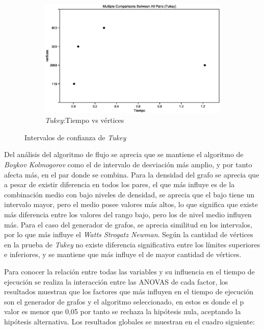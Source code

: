 \documentclass{article}
\begin{document}
\begin{figure}[h]
\begin{subfigure}{0.5\textwidth}
\includegraphics[width=0.9\linewidth]{Imagenes/tablatukeyvertices.eps}
\caption{\textit{Tukey}:Tiempo vs vértices}
\end{subfigure}
 
\caption{Intervalos de confianza de \textit{Tukey}}
\label{fig:Fig3}
\end{figure}

Del análisis del algoritmo de flujo se aprecia que se mantiene el algoritmo de \textit{Boykov Kolmogorov} 
como el de intervalo de desviación más amplio, y por tanto afecta más, en el par donde se combina. Para la densidad del grafo se aprecia que a pesar de existir diferencia en todos los pares, el que más influye es de la combinación medio con bajo niveles de densidad, se aprecia que el bajo tiene un intervalo mayor, pero el medio posee valores más altos, lo que significa que existe más diferencia entre los valores del rango bajo, pero los de nivel medio influyen más. Para el caso del generador de grafos, se aprecia similitud en los intervalos, por lo que más influye el \textit{Watts Strogatz Newman}. Según la cantidad de vértices en la prueba de \textit{Tukey} no existe diferencia significativa entre los límites superiores e inferiores, y se mantiene que más influye el de mayor cantidad de vértices.

Para conocer la relación entre todas las variables y su influencia en el tiempo de ejecución se realiza la interacción entre las ANOVAS de cada factor, los resultados muestran que los factores que más influyen en el tiempo de ejecución son el generador de grafos y el algoritmo seleccionado, en estos es donde el p\- valor es menor que 0,05 por tanto se rechaza la hipótesis nula, aceptando la hipótesis alternativa. Los resultados globales se muestran en el cuadro siguiente:
\end{document}
